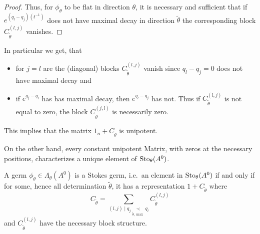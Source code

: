 \begin{proof}
\begin{comment}
    \begin{align*}
      \phi_\theta(t)
      &=t^Le^{Q(t^{-1})}\left(
        1_n+C_{\tilde\theta}
      \right)e^{-Q(t^{-1})}t^{-L}
    \\&=t^Le^{Q(t^{-1})}\left(
        1_n+\sum_{(l,j)}C_{\tilde\theta}^{(l,j)}
      \right)e^{-Q(t^{-1})}t^{-L}
    \\&=t^L\left(
        1_n+\sum_{(l,j)}e^{Q(t^{-1})}C_{\tilde\theta}^{(l,j)}e^{-Q(t^{-1})}
      \right)t^{-L}
    \\&=t^L\left(
          1_n+\sum_{(l,j)}C_{\tilde\theta}^{(l,j)}e^{(q_l-q_j)(t^{-1})}
        \right)t^{-L} \,.
    \end{align*}
  \end{comment}
  Thus, for $\phi_{\theta}$ to be flat in direction $\theta$, it is
  necessary and sufficient that if $e^{(q_l-q_j)(t^{-1})}$ does not have
  maximal decay in direction $\tilde\theta$ the corresponding
  block $C_{\tilde\theta}^{(l,j)}$ vanishes.
\end{proof}

In particular we get, that
\begin{itemize}
  \item for $j=l$ are the (diagonal) blocks $C_{\tilde\theta}^{(l,j)}$ vanish
    since $q_l-q_j=0$ does not have maximal decay and
  \item if $e^{q_j-q_l}$ has has maximal decay, then $e^{q_l-q_j}$ has not.
    Thus if $C_{\tilde\theta}^{(l,j)}$ is not equal to zero, the block
    $C_{\tilde\theta}^{(j,l)}$ is necessarily zero.
\end{itemize}
\begin{rem}
  This implies that the matrix $1_n+C_{\tilde\theta}$ is unipotent.
\end{rem}
On the other hand, every constant unipotent Matrix, with zeros at the necessary
positions, characterizes a unique element of $\operatorname{Sto}_\theta(A^0)$.

\begin{lem}
  A germ $\phi_\theta\in\Lambda_\theta(A^0)$ is a Stokes germ, i.e.\ an element
  in $\operatorname{Sto}_\theta(A^0)$ if and only if for some, hence all determination
  $\tilde\theta$, it has a representation $1+C_{\tilde\theta}$ where
  \[
    C_{\tilde\theta}=\sum_{(l,j)\mid q_j\underset{\tilde\theta,\max}{\prec}q_l}
    C_{\tilde\theta}^{(l,j)}
  \]
  and $C_{\tilde\theta}^{(l,j)}$ have the necessary block structure.
\end{lem}

